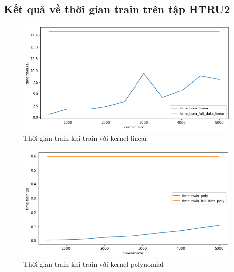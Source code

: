 \documentclass[a4paper, 12pt, oneside]{report}
\begin{document}
\subsection{Kết quả về thời gian train trên tập HTRU2}
\begin{center}
    \begin{figure}[H]
    \begin{center}
     \includegraphics[scale=0.4]{HTRU2_1.png}
    \end{center}
    \caption{Thời gian train khi train với kernel linear}
    \label{Hình 4.11}
    \end{figure}
\end{center}
\begin{center}
    \begin{figure}[H]
    \begin{center}
     \includegraphics[scale=0.4]{HTRU2_2.png}
    \end{center}
    \caption{Thời gian train khi train với kernel polynomial}
    \label{Hình 4.12}
    \end{figure}
\end{center}
\end{document}
